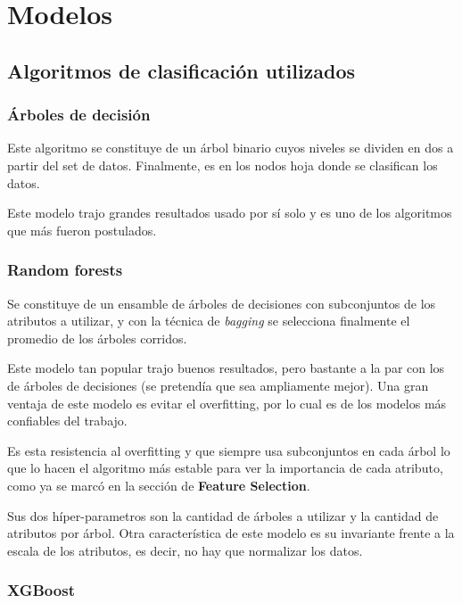\documentclass[a4paper]{article}
\begin{document}
\section{Modelos}

\subsection{Algoritmos de clasificación utilizados}

\subsubsection{Árboles de decisión}

Este algoritmo se constituye de un árbol binario cuyos niveles se dividen en dos a partir del set de datos. Finalmente, es en los nodos hoja donde se clasifican los datos.

Este modelo trajo grandes resultados usado por sí solo y es uno de los algoritmos que más fueron postulados.

\subsubsection{Random forests}

Se constituye de un ensamble de árboles de decisiones con subconjuntos de los atributos a utilizar, y con la técnica de \textit{bagging} se selecciona finalmente el promedio de los árboles corridos.

Este modelo tan popular trajo buenos resultados, pero bastante a la par con los de árboles de decisiones (se pretendía que sea ampliamente mejor). Una gran ventaja de este modelo es evitar el overfitting, por lo cual es de los modelos más confiables del trabajo. 

Es esta resistencia al overfitting y que siempre usa subconjuntos en cada árbol lo que lo hacen el algoritmo más estable para ver la importancia de cada atributo, como ya se marcó en la sección de \textbf{Feature Selection}.

Sus dos híper-parametros son la cantidad de árboles a utilizar y la cantidad de atributos por árbol. Otra característica de este modelo es su invariante frente a la escala de los atributos, es decir, no hay que normalizar los datos.

\subsubsection{XGBoost}
\end{document}
